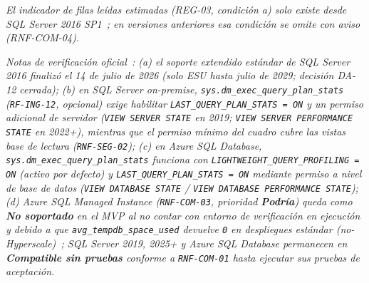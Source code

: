 \documentclass[11pt,a4paper]{report}
\begin{document}
\textit{El indicador de filas le\'idas estimadas (REG-03, condici\'on a) solo existe desde SQL Server 2016 SP1~\cite{R33}; en versiones anteriores esa condici\'on se omite con aviso (RNF-COM-04).}

\textit{Notas de verificaci\'on oficial~\cite{R4,R5,R7,R8}: (a) el soporte extendido est\'andar de SQL Server 2016 finaliz\'o el 14 de julio de 2026 (solo ESU hasta julio de 2029; decisi\'on DA-12 cerrada); (b) en SQL Server on-premise, \texttt{sys.dm\_exec\_query\_plan\_stats} (\texttt{RF-ING-12}, opcional) exige habilitar \texttt{LAST\_QUERY\_PLAN\_STATS = ON} y un permiso adicional de servidor (\texttt{VIEW SERVER STATE} en 2019; \texttt{VIEW SERVER PERFORMANCE STATE} en 2022+), mientras que el permiso m\'inimo del cuadro cubre las vistas base de lectura (\texttt{RNF-SEG-02}); (c) en Azure SQL Database, \texttt{sys.dm\_exec\_query\_plan\_stats} funciona con \texttt{LIGHTWEIGHT\_QUERY\_PROFILING = ON} (activo por defecto) y \texttt{LAST\_QUERY\_PLAN\_STATS = ON} mediante permiso a nivel de base de datos (\texttt{VIEW DATABASE STATE} / \texttt{VIEW DATABASE PERFORMANCE STATE}); (d) Azure SQL Managed Instance (\texttt{RNF-COM-03}, prioridad \textbf{Podr\'ia}) queda como \textbf{No soportado} en el MVP al no contar con entorno de verificaci\'on en ejecuci\'on y debido a que \texttt{avg\_tempdb\_space\_used} devuelve \texttt{0} en despliegues est\'andar (no-Hyperscale)~\cite{R5}; SQL Server 2019, 2025+ y Azure SQL Database permanecen en \textbf{Compatible sin pruebas} conforme a \texttt{RNF-COM-01} hasta ejecutar sus pruebas de aceptaci\'on.}
\end{document}
